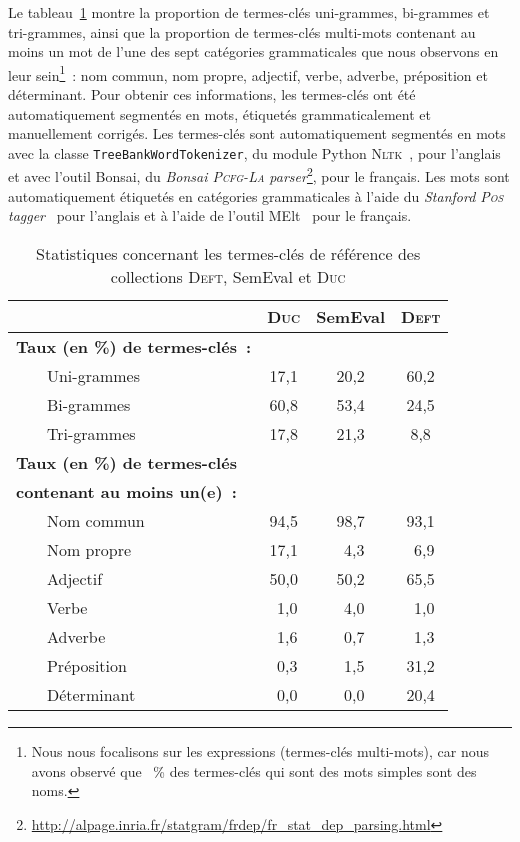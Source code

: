       Le tableau~\ref{tab:candidate_selection-train_stats} montre la proportion
      de termes-clés uni-grammes, bi-grammes et tri-grammes, ainsi que la
      proportion de termes-clés multi-mots contenant au moins un mot de l'une
      des sept catégories grammaticales que nous observons en leur
      sein\footnote{ Nous nous focalisons sur les expressions (termes-clés
      multi-mots), car nous avons observé que \TODO{\dots}~\% des termes-clés
      qui sont des mots simples sont des noms. }~: nom commun, nom propre,
      adjectif, verbe, adverbe, préposition et déterminant. Pour obtenir ces
      informations, les termes-clés ont été automatiquement segmentés en mots,
      étiquetés grammaticalement et manuellement corrigés. Les termes-clés sont
      automatiquement segmentés en mots avec la classe
      \texttt{TreeBankWordTokenizer}, du module Python
      \textsc{Nltk}~\cite[\textit{Natural Language ToolKit}]{bird2009nltk}, pour
      l'anglais et avec l'outil Bonsai, du \textit{Bonsai \textsc{Pcfg-La}
      parser}\footnote{\url{http://alpage.inria.fr/statgram/frdep/fr_stat_dep_parsing.html}},
      pour le français. Les mots sont automatiquement étiquetés en catégories
      grammaticales à l'aide du \textit{Stanford \textsc{Pos}
      tagger}~\cite{toutanova2003stanfordpostagger} pour l'anglais et à l'aide
      de l'outil MElt~\cite{denis2009melt} pour le français.
      \begin{table}[!h]
        \centering
        \begin{tabular}{ll|ccc}
          \toprule
          & & \textbf{\textsc{Duc}} & \textbf{SemEval} & \textbf{\textsc{Deft}}\\
          \hline
          \multicolumn{2}{l|}{\textbf{Taux (en \%) de termes-clés~:}}\\
          & Uni-grammes & 17,1 & 20,2 & 60,2\\
          & Bi-grammes & 60,8 & 53,4 & 24,5\\
          & Tri-grammes & 17,8 & 21,3 & 8,8\\
          \hline
          \multicolumn{2}{l|}{\textbf{Taux (en \%) de termes-clés}} & & &\\
          \multicolumn{2}{l|}{\textbf{contenant au moins un(e)~:}} & & &\\
          & Nom commun & 94,5 & 98,7 & 93,1\\
          & Nom propre & 17,1 & $~~$4,3 & $~~$6,9\\
          & Adjectif & 50,0 & 50,2 & 65,5\\
          & Verbe & $~~$1,0 & $~~$4,0 & $~~$1,0\\
          & Adverbe & $~~$1,6 & $~~$0,7 & $~~$1,3\\
          & Préposition & $~~$0,3 & $~~$1,5 & 31,2\\
          & Déterminant & $~~$0,0 & $~~$0,0 & 20,4\\
          \bottomrule
        \end{tabular}
        \caption{Statistiques concernant les termes-clés de référence des
                 collections \textsc{Deft}, SemEval et \textsc{Duc}
                 \label{tab:candidate_selection-train_stats}}
      \end{table}

